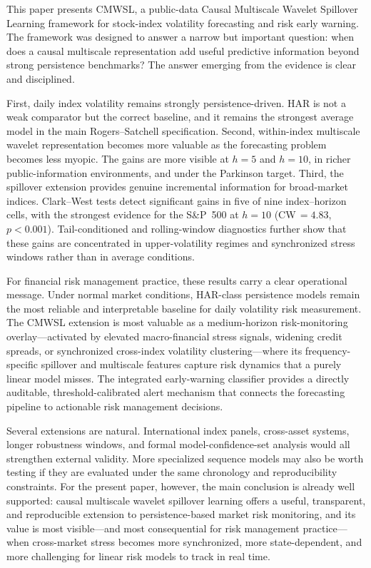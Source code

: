 This paper presents CMWSL, a public-data Causal Multiscale Wavelet Spillover Learning framework for stock-index volatility forecasting and risk early warning. The framework was designed to answer a narrow but important question: when does a causal multiscale representation add useful predictive information beyond strong persistence benchmarks? The answer emerging from the evidence is clear and disciplined.

First, daily index volatility remains strongly persistence-driven. HAR is not a weak comparator but the correct baseline, and it remains the strongest average model in the main Rogers--Satchell specification. Second, within-index multiscale wavelet representation becomes more valuable as the forecasting problem becomes less myopic. The gains are more visible at $h=5$ and $h=10$, in richer public-information environments, and under the Parkinson target. Third, the spillover extension provides genuine incremental information for broad-market indices. Clark--West tests detect significant gains in five of nine index--horizon cells, with the strongest evidence for the S\&P~500 at $h=10$ (CW\,$=4.83$, $p<0.001$). Tail-conditioned and rolling-window diagnostics further show that these gains are concentrated in upper-volatility regimes and synchronized stress windows rather than in average conditions.

For financial risk management practice, these results carry a clear operational message. Under normal market conditions, HAR-class persistence models remain the most reliable and interpretable baseline for daily volatility risk measurement. The CMWSL extension is most valuable as a medium-horizon risk-monitoring overlay---activated by elevated macro-financial stress signals, widening credit spreads, or synchronized cross-index volatility clustering---where its frequency-specific spillover and multiscale features capture risk dynamics that a purely linear model misses. The integrated early-warning classifier provides a directly auditable, threshold-calibrated alert mechanism that connects the forecasting pipeline to actionable risk management decisions.

Several extensions are natural. International index panels, cross-asset systems, longer robustness windows, and formal model-confidence-set analysis would all strengthen external validity. More specialized sequence models may also be worth testing if they are evaluated under the same chronology and reproducibility constraints. For the present paper, however, the main conclusion is already well supported: causal multiscale wavelet spillover learning offers a useful, transparent, and reproducible extension to persistence-based market risk monitoring, and its value is most visible---and most consequential for risk management practice---when cross-market stress becomes more synchronized, more state-dependent, and more challenging for linear risk models to track in real time.
